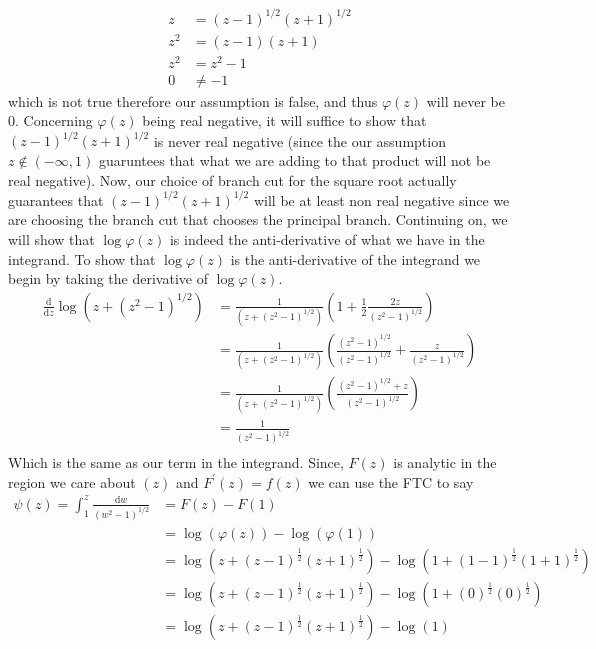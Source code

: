 \documentclass[10pt]{amsart}
\newcommand{\D}{\mathrm{d}}
\theoremstyle{nonumberplain}
\begin{document}
\begin{enumerate}[label={\bf {\arabic*}:}]
\begin{itemize}
   \begin{align*}
   z &= (z - 1)^{1/2}(z + 1)^{1/2} \\
   z^2 &= (z - 1)(z + 1) \\
   z^2 &= z^2 - 1 \\
   0 &\neq - 1
   \end{align*}
   which is not true therefore our assumption is false, and thus $\varphi(z)$ will never be 0.
   Concerning $\varphi(z)$ being real negative, it will suffice to show that $(z - 1)^{1/2}(z + 1)^{1/2}$ is never real negative (since the our assumption $z \not \in (-\infty, 1)$ guaruntees that what we are adding to that product will not be real negative).
   Now, our choice of branch cut for the square root actually guarantees that $(z - 1)^{1/2}(z + 1)^{1/2}$ will be at least non real negative since we are choosing the branch cut that chooses the principal branch.
   Continuing on, we will show that $\log \varphi(z)$ is indeed the anti-derivative of what we have in the integrand.
   To show that $\log \varphi(z)$ is the anti-derivative of the integrand we begin by taking the derivative of $\log \varphi(z)$.
   \begin{align*}
   \frac{\D}{\D z} \log (z + (z^2 - 1)^{1/2}) &= \frac{1}{(z + (z^2 - 1)^{1/2})}\left( 1 + \frac{1}{2}\frac{2z}{(z^2 - 1)^{1/2}} \right) \\
							     &= \frac{1}{(z + (z^2 - 1)^{1/2})}\left( \frac{(z^2 - 1)^{1/2}}{(z^2 - 1)^{1/2}} + \frac{z}{(z^2 - 1)^{1/2}} \right) \\
							     &= \frac{1}{(z + (z^2 - 1)^{1/2})}\left( \frac{(z^2 - 1)^{1/2} + z}{(z^2 - 1)^{1/2}} \right) \\
							     &= \frac{1}{(z^2 - 1)^{1/2}} \\
   \end{align*}
   Which is the same as our term in the integrand.
   Since, $F(z)$ is analytic in the region we care about $(z)$ and $F^\prime(z) = f(z)$ we can use the FTC to say
   \begin{align*}
   \psi(z) = \int_1^z \frac{\D w}{(w^2 - 1)^{1/2}} &= F(z) - F(1) \\
							&= \log(\varphi(z)) - \log(\varphi(1)) \\
							&= \log(z + (z - 1)^{\frac{1}{2}}(z + 1)^{\frac{1}{2}}) - \log(1 + (1 - 1)^{\frac{1}{2}}(1 + 1)^{\frac{1}{2}}) \\
							&= \log(z + (z - 1)^{\frac{1}{2}}(z + 1)^{\frac{1}{2}}) - \log(1 + (0)^{\frac{1}{2}}(0)^{\frac{1}{2}}) \\
							&= \log(z + (z - 1)^{\frac{1}{2}}(z + 1)^{\frac{1}{2}}) - \log(1) \\

\end{align*}
\end{itemize}
\end{enumerate}
\end{document}
